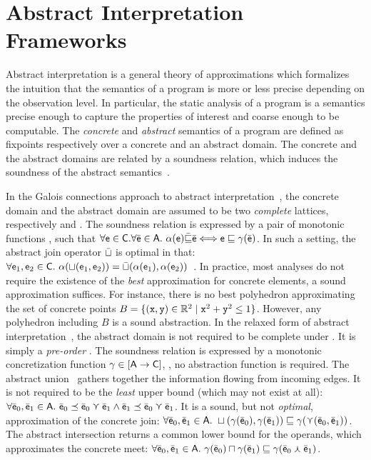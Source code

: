 \documentclass{llncs}
\begin{document}
\section{Abstract Interpretation Frameworks}
\label{sec:AI}
Abstract interpretation is a general theory of approximations which formalizes the intuition that the semantics of a program is more or less precise depending on the observation level.
In particular, the static analysis of a program is a semantics precise enough to capture the properties of interest and coarse enough to be computable.
The \emph{concrete} and \emph{abstract} semantics of a program are defined as fixpoints respectively over a concrete  and an abstract domain.
The concrete and the abstract domains are related by a soundness relation, which induces the soundness of the abstract semantics~\cite{CousotCousot92-2}.

In the Galois connections approach to abstract interpretation~\cite{CousotCousot77}, the concrete domain and the abstract domain are assumed to be two \emph{complete} lattices, respectively  and .
The soundness relation is expressed by a pair of monotonic functions
\tupla{\alpha, \gamma}, such that $\forall \mathsf{e}\in \mathsf{C}. \forall \bar{\mathsf{\mathsf{e}}} \in \mathsf{A}.\ \alpha(\mathsf{e}) \bar{\sqsubseteq} \bar{\mathsf{\mathsf{e}}} \Longleftrightarrow \mathsf{e} \sqsubseteq \gamma(\bar{\mathsf{\mathsf{e}}})$.
In such a setting, the abstract join operator $\bar{\sqcup}$ is optimal in
that:  \(\forall \el{e}_1, \el{e}_2 \in \dom{C}.\ \alpha(\join(\el{e}_1 ,
\el{e}_2)) = \ajoin(\alpha(\el{e}_1), \alpha(\el{e}_2)) \)~\cite{CousotCousot92-1}.
In practice, most analyses do not require the existence of the \emph{best} approximation for concrete elements, a sound approximation suffices.
For instance, there is no best polyhedron approximating the set of concrete points $B = \{ (\mathtt{x}, \mathtt{y}) \in \mathbb{R}^2 \mid  \mathtt{x}^2 + \mathtt{y}^2 \leq 1\}$.
However, any polyhedron including $B$ is a sound abstraction.
In the relaxed form of abstract interpretation~\cite{CousotCousot92-2}, the abstract domain is not required to be complete under \ajoin.
It is simply a \emph{pre-order} .
The soundness relation is expressed by a monotonic concretization function $\gamma \in [\mathsf{A} \rightarrow\mathsf{C}]$, \ie, no abstraction function is required.
The abstract union \cjoin\ gathers together the information flowing from incoming edges.
It is not required to be the \emph{least} upper bound (which may not exist at all): $\forall \bar{\mathsf{\mathsf{e}}}_0, \bar{\mathsf{\mathsf{e}}}_1 \in {\mathsf{A}}.\ \bar{\mathsf{\mathsf{e}}}_0 \preceq \bar{\mathsf{\mathsf{e}}}_0 \curlyvee \bar{\mathsf{\mathsf{e}}}_1 \wedge  \bar{\mathsf{\mathsf{e}}}_1 \preceq \bar{\mathsf{\mathsf{e}}}_0 \curlyvee \bar{\mathsf{\mathsf{e}}}_1$.
It is a sound, but not \emph{optimal}, approximation of the concrete join: $\forall \bar{\mathsf{\mathsf{e}}}_0, \bar{\mathsf{\mathsf{e}}}_1 \in {\mathsf{A}}.\ \sqcup(\gamma(\bar{\mathsf{\mathsf{e}}}_0),  \gamma(\bar{\mathsf{\mathsf{e}}}_1)) \sqsubseteq \gamma(\curlyvee(\bar{\mathsf{\mathsf{e}}}_0,  \bar{\mathsf{\mathsf{e}}}_1))$.
The abstract intersection returns a common lower bound for the operands, which approximates the concrete meet:  $\forall \bar{\mathsf{\mathsf{e}}}_0, \bar{\mathsf{\mathsf{e}}}_1 \in {\mathsf{A}}.\ \gamma(\bar{\mathsf{\mathsf{e}}}_0) \sqcap \gamma(\bar{\mathsf{\mathsf{e}}}_1) \sqsubseteq \gamma(\bar{\mathsf{\mathsf{e}}}_0 \curlywedge \bar{\mathsf{\mathsf{e}}}_1)$.
\end{document}
